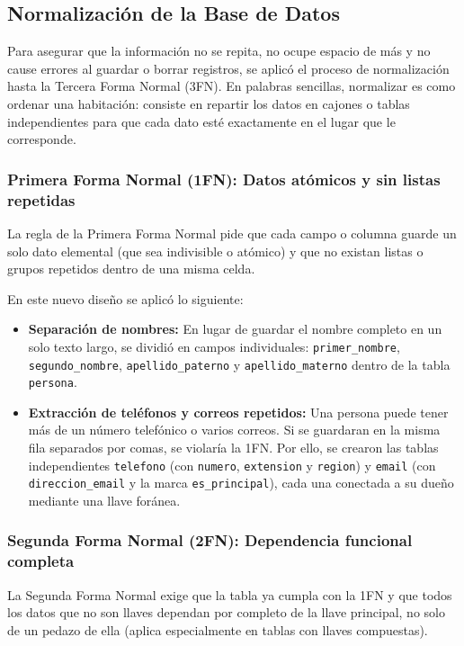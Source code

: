 \subsection{Normalización de la Base de Datos}
Para asegurar que la información no se repita, no ocupe espacio de más y no cause errores al guardar o borrar registros, se aplicó el proceso de normalización hasta la Tercera Forma Normal (3FN). En palabras sencillas, normalizar es como ordenar una habitación: consiste en repartir los datos en cajones o tablas independientes para que cada dato esté exactamente en el lugar que le corresponde.

\subsubsection{Primera Forma Normal (1FN): Datos atómicos y sin listas repetidas}
La regla de la Primera Forma Normal pide que cada campo o columna guarde un solo dato elemental (que sea indivisible o atómico) y que no existan listas o grupos repetidos dentro de una misma celda.

En este nuevo diseño se aplicó lo siguiente:
\begin{itemize}
    \item \textbf{Separación de nombres:} En lugar de guardar el nombre completo en un solo texto largo, se dividió en campos individuales: \texttt{primer\_nombre}, \texttt{segundo\_nombre}, \texttt{apellido\_paterno} y \texttt{apellido\_materno} dentro de la tabla \texttt{persona}.
    \item \textbf{Extracción de teléfonos y correos repetidos:} Una persona puede tener más de un número telefónico o varios correos. Si se guardaran en la misma fila separados por comas, se violaría la 1FN. Por ello, se crearon las tablas independientes \texttt{telefono} (con \texttt{numero}, \texttt{extension} y \texttt{region}) y \texttt{email} (con \texttt{direccion\_email} y la marca \texttt{es\_principal}), cada una conectada a su dueño mediante una llave foránea.
\end{itemize}

\subsubsection{Segunda Forma Normal (2FN): Dependencia funcional completa}
La Segunda Forma Normal exige que la tabla ya cumpla con la 1FN y que todos los datos que no son llaves dependan por completo de la llave principal, no solo de un pedazo de ella (aplica especialmente en tablas con llaves compuestas).

